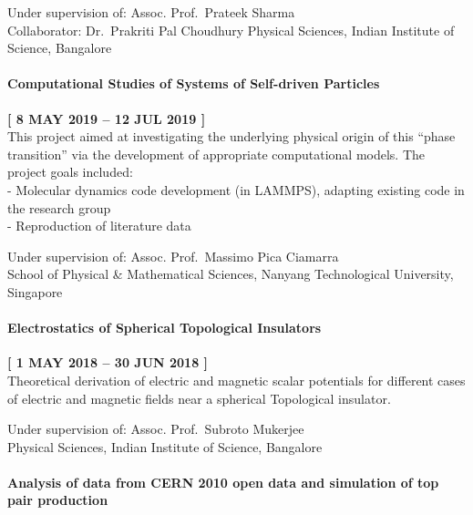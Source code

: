 \documentclass[
  a4paper,
  11pt,
  oneside]{article}
\let\oldparagraph\paragraph
\renewcommand{\paragraph}[1]{\oldparagraph{#1}\mbox{}}
\begin{document}
Under supervision of: Assoc. Prof.~Prateek Sharma\\
Collaborator: Dr.~Prakriti Pal Choudhury Physical Sciences, Indian
Institute of Science, Bangalore

\hypertarget{computational-studies-of-systems-of-self-driven-particles}{%
\paragraph{Computational Studies of Systems of Self-driven
Particles}\label{computational-studies-of-systems-of-self-driven-particles}}

\textbf{{[} 8 MAY 2019 -- 12 JUL 2019 {]}}\\
This project aimed at investigating the underlying physical origin of
this ``phase transition'' via the development of appropriate
computational models. The project goals included:\\
- Molecular dynamics code development (in LAMMPS), adapting existing
code in the research group\\
- Reproduction of literature data

Under supervision of: Assoc. Prof.~Massimo Pica Ciamarra\\
School of Physical \& Mathematical Sciences, Nanyang Technological
University, Singapore

\hypertarget{electrostatics-of-spherical-topological-insulators}{%
\paragraph{Electrostatics of Spherical Topological
Insulators}\label{electrostatics-of-spherical-topological-insulators}}

\textbf{{[} 1 MAY 2018 -- 30 JUN 2018 {]}}\\
Theoretical derivation of electric and magnetic scalar potentials for
different cases of electric and magnetic fields near a spherical
Topological insulator.

Under supervision of: Assoc. Prof.~Subroto Mukerjee\\
Physical Sciences, Indian Institute of Science, Bangalore

\hypertarget{analysis-of-data-from-cern-2010-open-data-and-simulation-of-top-pair-production}{%
\paragraph{Analysis of data from CERN 2010 open data and simulation of
top pair
production}\label{analysis-of-data-from-cern-2010-open-data-and-simulation-of-top-pair-production}}
\end{document}
